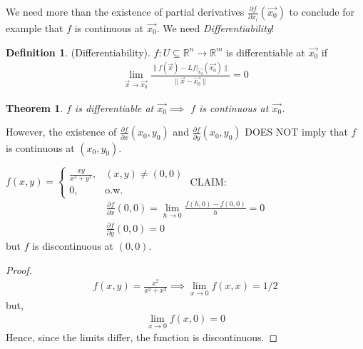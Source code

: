 \documentclass[12pt]{book}
\newtheorem{theorem}{Theorem}[section]
\theoremstyle{definition}
\newtheorem{definition}{Definition}[section]
\theoremstyle{remark}
\begin{document}
    We need more than the existence of partial derivatives $\frac{\partial f}{\partial x_i}(\vec{{x_0}} {}) $ to conclude for example that $f$ is continuous at $\vec{{x_0}}.$ We need \textit{Differentiability}! 
    \begin{definition}(Differentiability). $f: U\subseteq \mathbb{R}^n \rightarrow \mathbb{R}^m$ is differentiable at $\vec{{x_0}} $ if \begin{equation*}
      \begin{split}
        \lim_{\vec{{x}} \rightarrow \vec{{x_0}} }\frac{\|f(\vec{{x}}) -Lf|_{\vec{{x_0}}} (\vec{{x_0}}) \|}{\| \vec{{x}} -\vec{{x_0}} \|} = 0
      \end{split}
    \end{equation*}
    \end{definition}
    \begin{theorem} 
      $f$ is differentiable at $\vec{{x_0}} \implies$ $f$ is continuous at $\vec{{x_0}} $. 
    \end{theorem}
    However, the existence of $\frac{\partial f}{\partial x}(x_0,y_0) $ and $\frac{\partial f}{\partial y} (x_0, y_0)$ DOES NOT imply that $f$ is continuous at $(x_0, y_0)$. 
    \begin{example}
      $f(x,y) = \left\{\begin{matrix}\frac{xy}{x^2+y^2} , & (x,y) \neq (0,0) \\ 0, & \text{o.w.} \end{matrix} \right. $
     \newline 
      CLAIM: 
      \begin{equation*}
        \begin{split}
          \frac{\partial f }{\partial x} (0,0) = \lim_{h \rightarrow 0}\frac{f(h,0) - f(0,0)}{h}= 0 \\ 
          \frac{\partial f }{\partial y} (0,0) = 0
        \end{split}
      \end{equation*}
      but $f$ is discontinuous at $(0,0)$. 
      \begin{proof} 
        \begin{equation*}
          \begin{split}
            f(x,y) = \frac{x^2}{x^2+ x^2} \implies \lim_{x \rightarrow 0} f(x,x) = 1/2 
          \end{split}
        \end{equation*}
        but, 
        \begin{equation*}
          \begin{split}
            \lim_{x \rightarrow 0} f(x, 0) = 0
          \end{split}
        \end{equation*}
        Hence, since the limits differ, the function is discontinuous.
      \end{proof}
    \end{example}
\end{document}
